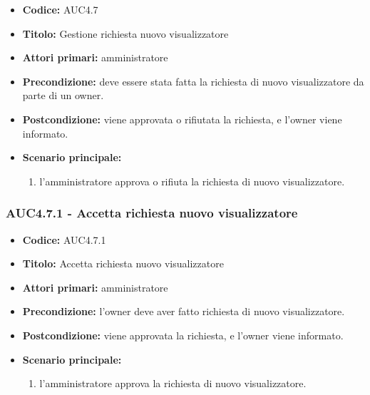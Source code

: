 \documentclass[casi-duso]{subfiles}
\begin{document}
\begin{itemize}
  \item \textbf{Codice:} AUC4.7
  \item \textbf{Titolo:} Gestione richiesta nuovo visualizzatore
  \item \textbf{Attori primari:} amministratore
  \item \textbf{Precondizione:} deve essere stata fatta la richiesta di nuovo visualizzatore da parte di un owner.
  \item \textbf{Postcondizione:} viene approvata o rifiutata la richiesta, e l'owner viene informato.
  \item \textbf{Scenario principale:}
  \begin{enumerate}
    \item l'amministratore approva o rifiuta la richiesta di nuovo visualizzatore.
  \end{enumerate}
\end{itemize}

\subsubsection{AUC4.7.1 - Accetta richiesta nuovo visualizzatore}%
\label{subsub:AUC4.7.1}
\begin{itemize}
  \item \textbf{Codice:} AUC4.7.1
  \item \textbf{Titolo:} Accetta richiesta nuovo visualizzatore
  \item \textbf{Attori primari:} amministratore
  \item \textbf{Precondizione:} l'owner deve aver fatto richiesta di nuovo visualizzatore.
  \item \textbf{Postcondizione:} viene approvata la richiesta, e l'owner viene informato.
  \item \textbf{Scenario principale:}
  \begin{enumerate}
    \item l'amministratore approva la richiesta di nuovo visualizzatore.
  \end{enumerate}
\end{itemize}  
\end{document}
